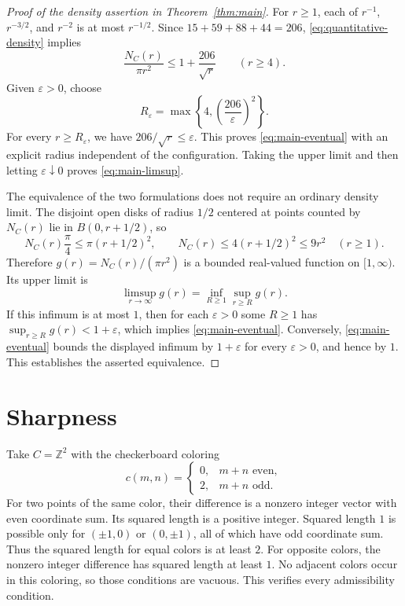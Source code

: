 \documentclass[11pt,a4paper]{article}
\theoremstyle{definition}
\theoremstyle{remark}
\newcommand{\Z}{\mathbb{Z}}
\begin{document}
\begin{proof}[Proof of the density assertion in Theorem~\ref{thm:main}]
For $r\geq1$, each of $r^{-1}$, $r^{-3/2}$, and $r^{-2}$ is at most
$r^{-1/2}$. Since $15+59+88+44=206$, \eqref{eq:quantitative-density}
implies
\[
\frac{N_C(r)}{\pi r^2}\leq1+\frac{206}{\sqrt r}
\qquad(r\geq4).
\]
Given $\varepsilon>0$, choose
\[
R_\varepsilon=\max\left\{4,\left(\frac{206}{\varepsilon}\right)^2\right\}.
\]
For every $r\geq R_\varepsilon$, we have $206/\sqrt r\leq\varepsilon$.
This proves \eqref{eq:main-eventual} with an explicit radius independent
of the configuration. Taking the upper limit and then letting
$\varepsilon\downarrow0$ proves \eqref{eq:main-limsup}.

The equivalence of the two formulations does not require an ordinary
density limit. The disjoint open disks of radius $1/2$
centered at points counted by $N_C(r)$ lie in $B(0,r+1/2)$, so
\[
N_C(r)\frac\pi4\leq\pi(r+1/2)^2,
\qquad
N_C(r)\leq4(r+1/2)^2\leq9r^2\quad(r\geq1).
\]
Therefore $g(r)=N_C(r)/(\pi r^2)$ is a bounded real-valued function on
$[1,\infty)$. Its upper limit is
\[
\limsup_{r\to\infty}g(r)
=\inf_{R\geq1}\sup_{r\geq R}g(r).
\]
If this infimum is at most $1$, then for each $\varepsilon>0$ some
$R\geq1$ has $\sup_{r\geq R}g(r)<1+\varepsilon$, which implies
\eqref{eq:main-eventual}. Conversely, \eqref{eq:main-eventual} bounds
the displayed infimum by $1+\varepsilon$ for every $\varepsilon>0$,
and hence by $1$. This establishes the asserted equivalence.
\end{proof}

\section{Sharpness}
\label{sec:sharpness}

Take $C=\Z^2$ with the checkerboard coloring
\begin{equation}
\label{eq:checkerboard}
c(m,n)=
\begin{cases}
0,&m+n\text{ even},\\
2,&m+n\text{ odd}.
\end{cases}
\end{equation}
For two points of the same color, their difference is a nonzero
integer vector with even coordinate sum. Its squared length is a positive
integer. Squared length $1$ is possible only for $(\pm1,0)$ or
$(0,\pm1)$, all of which have odd coordinate sum. Thus the squared
length for equal colors is at least $2$. For opposite colors, the
nonzero integer difference has squared length at least $1$. No adjacent
colors occur in this coloring, so those conditions are vacuous. This
verifies every admissibility condition.
\end{document}
